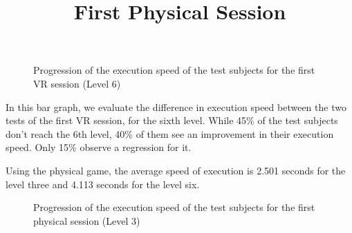 \documentclass[12pt, openany, twocolumn]{article}
\begin{document}
                \begin{figure}[H]
                    \setlength{\fboxsep}{0pt}
                    \setlength{\fboxrule}{1pt}
                    \caption{Progression of the execution speed of the test subjects for the first VR session (Level 6)}
                \end{figure}
        
            In this bar graph, we evaluate the difference in execution speed between the two tests of the first VR session, for the sixth level. 
            While 45\% of the test subjects don't reach the 6th level, 40\% of them see an improvement in their execution speed. Only 15\% observe a regression for it.
            \\

            \noindent \title{\textbf{First Physical Session}}  \vspace{0.25cm}
            
            Using the physical game, the average speed of execution is 2.501 seconds for the level three and 4.113 seconds for the level six.

                \begin{figure}[H]
                    \setlength{\fboxsep}{0pt}
                    \setlength{\fboxrule}{1pt}
                    \caption{Progression of the execution speed of the test subjects for the first physical session (Level 3)}
                \end{figure}
\end{document}
